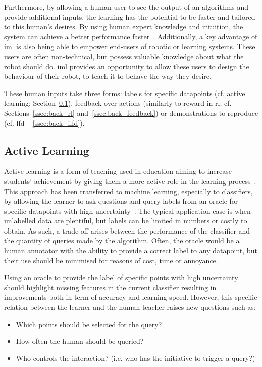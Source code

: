 Furthermore, by allowing a human user to see the output of an algorithms and provide additional inputs, the learning has the potential to be faster and tailored to this human's desires. By using human expert knowledge and intuition, the system can achieve a better performance faster~\citep{thomaz2008teachable}. Additionally, a key advantage of \gls{iml} is also being able to empower end-users of robotic or learning systems. These users are often non-technical, but possess valuable knowledge about what the robot should do. \gls{iml} provides an opportunity to allow these users to design the behaviour of their robot, to teach it to behave the way they desire.

These human inputs take three forms: labels for specific datapoints (cf. active learning; Section~\ref{ssec:back_active}), feedback over actions (similarly to reward in \gls{rl}; cf. Sections~\ref{ssec:back_rl} and~\ref{ssec:back_feedback}) or demonstrations to reproduce (cf. \gls{lfd} -~\ref{ssec:back_ilfd}).

\subsection{Active Learning} \label{ssec:back_active}

Active learning is a form of teaching used in education aiming to increase students' achievement by giving them a more active role in the learning process~\citep{johnson1991active}. This approach has been transferred to machine learning, especially to classifiers, by allowing the learner to ask questions and query labels from an oracle for specific datapoints with high uncertainty~\citep{settles2012active}. The typical application case is when unlabelled data are plentiful, but labels can be limited in numbers or costly to obtain. As such, a trade-off arises between the performance of the classifier and the quantity of queries made by the algorithm. Often, the oracle would be a human annotator with the ability to provide a correct label to any datapoint, but their use should be minimised for reasons of cost, time or annoyance.

Using an oracle to provide the label of specific points with high uncertainty should highlight missing features in the current classifier resulting in improvements both in term of accuracy and learning speed. However, this specific relation between the learner and the human teacher raises new questions such as: 
\begin{itemize}
	\item Which points should be selected for the query?
	\item How often the human should be queried?
	\item Who controls the interaction? (i.e. who has the initiative to trigger a query?)
\end{itemize}

